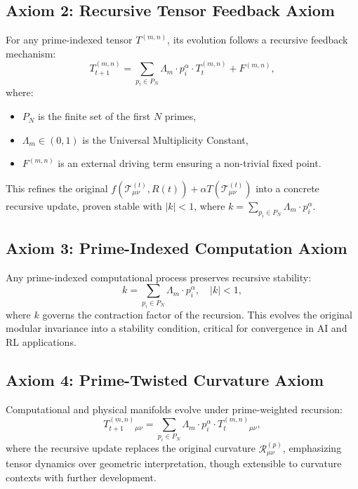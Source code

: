 \documentclass{article}
\theoremstyle{plain}
\begin{document}
 \subsection{Axiom 2: Recursive Tensor Feedback Axiom}
For any prime-indexed tensor \( T^{(m,n)} \), its evolution follows a recursive feedback mechanism:
\begin{equation}
    T_{t+1}^{(m,n)} = \sum_{p_i \in P_N} \Lambda_m \cdot p_i^\alpha \cdot T_t^{(m,n)} + F^{(m,n)},
\end{equation}
where:
\begin{itemize}
    \item \( P_N \) is the finite set of the first \( N \) primes,
    \item \( \Lambda_m \in (0, 1) \) is the Universal Multiplicity Constant,
    \item \( F^{(m,n)} \) is an external driving term ensuring a non-trivial fixed point.
\end{itemize}
This refines the original \( f(\mathcal{T}_{\mu\nu}^{(t)}, R(t)) + \alpha T(\mathcal{T}_{\mu\nu}^{(t)}) \) into a concrete recursive update, proven stable with \( |k| < 1 \), where \( k = \sum_{p_i \in P_N} \Lambda_m \cdot p_i^\alpha \).

 \subsection{Axiom 3: Prime-Indexed Computation Axiom}
Any prime-indexed computational process preserves recursive stability:
\begin{equation}
    k = \sum_{p_i \in P_N} \Lambda_m \cdot p_i^\alpha, \quad |k| < 1,
\end{equation}
where \( k \) governs the contraction factor of the recursion. This evolves the original modular invariance into a stability condition, critical for convergence in AI and RL applications.

 \subsection{Axiom 4: Prime-Twisted Curvature Axiom}
Computational and physical manifolds evolve under prime-weighted recursion:
\begin{equation}
    T_{t+1}^{(m,n)}{}_{\mu\nu} = \sum_{p_i \in P_N} \Lambda_m \cdot p_i^\alpha \cdot T_t^{(m,n)}{}_{\mu\nu},
\end{equation}
where the recursive update replaces the original curvature \( \mathcal{R}_{\mu\nu}^{(p)} \), emphasizing tensor dynamics over geometric interpretation, though extensible to curvature contexts with further development.
\end{document}
